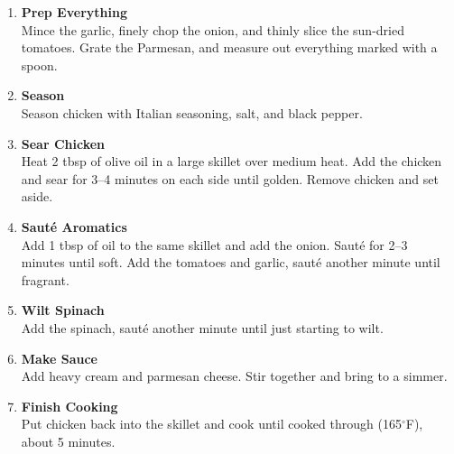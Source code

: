 \begin{enumerate}

      \item \textbf{Prep Everything} \\
            Mince the garlic, finely chop the onion, and thinly slice the sun-dried tomatoes. Grate the Parmesan, and measure out everything marked with a spoon.

      \item \textbf{Season} \\
            Season chicken with Italian seasoning, salt, and black pepper.

      \item \textbf{Sear Chicken} \\
            Heat 2 tbsp of olive oil in a large skillet over medium heat. Add the chicken and sear for 3–4 minutes on each side until golden. Remove chicken and set aside.

      \item \textbf{Sauté Aromatics} \\
            Add 1 tbsp of oil to the same skillet and add the onion. Sauté for 2–3 minutes until soft. Add the tomatoes and garlic, sauté another minute until fragrant.

      \item \textbf{Wilt Spinach} \\
            Add the spinach, sauté another minute until just starting to wilt.

      \item \textbf{Make Sauce} \\
            Add heavy cream and parmesan cheese. Stir together and bring to a simmer.

      \item \textbf{Finish Cooking} \\
            Put chicken back into the skillet and cook until cooked through (165$^\circ$F), about 5 minutes.

\end{enumerate}


